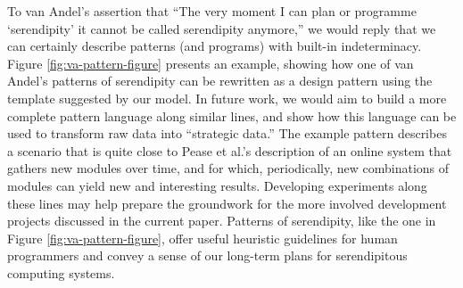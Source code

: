 
To van Andel's assertion that ``The very moment I can plan or
programme `serendipity' it cannot be called serendipity anymore,'' we
would reply that we can certainly describe patterns (and programs)
with built-in indeterminacy.  Figure \ref{fig:va-pattern-figure}
presents an example, showing how one of van Andel's patterns of
serendipity can be rewritten as a design pattern using the template
suggested by our model.  In future work, we would aim to build a more
complete pattern language along similar lines, and show how 
this language can be used to transform raw data into ``strategic data.''
%
The example pattern describes a scenario that is quite close to Pease et al.'s \citeyear{pease2013discussion} description of an online
system that gathers new modules over time, and for which,
periodically, new combinations of modules can yield new and
interesting results.
%
Developing experiments along these lines may help prepare the
groundwork for the more involved development projects discussed in the
current paper.
%
Patterns of serendipity, like the one in Figure \ref{fig:va-pattern-figure},
offer useful heuristic guidelines for human programmers and convey a sense of our long-term
plans for serendipitous computing systems.

